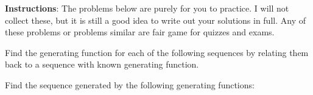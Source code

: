 \documentclass[10pt]{exam}
\begin{document}
\noindent \textbf{Instructions}: The problems below are purely for you to practice.  I will not collect these, but it is still a good idea to write out your solutions in full.  Any of these problems or problems similar are fair game for quizzes and exams.  

\begin{questions}
\question Find the generating function for each of the following sequences by relating them back to a sequence with known generating function.

\question Find the sequence generated by the following generating functions:
\end{questions}
\end{document}
